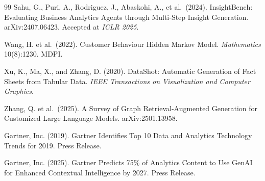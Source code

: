 \documentclass[12pt, a4paper]{article}
\begin{document}
\begin{thebibliography}{99}
Sahu, G., Puri, A., Rodriguez, J., Abaskohi, A., et al.\ (2024).
InsightBench: Evaluating Business Analytics Agents through Multi-Step Insight Generation.
arXiv:2407.06423. Accepted at \textit{ICLR 2025}.

Wang, H. et al.\ (2022).
Customer Behaviour Hidden Markov Model.
\textit{Mathematics} 10(8):1230. MDPI.

Xu, K., Ma, X., and Zhang, D. (2020).
DataShot: Automatic Generation of Fact Sheets from Tabular Data.
\textit{IEEE Transactions on Visualization and Computer Graphics}.

Zhang, Q. et al.\ (2025).
A Survey of Graph Retrieval-Augmented Generation for Customized Large Language Models.
arXiv:2501.13958.

Gartner, Inc. (2019).
Gartner Identifies Top 10 Data and Analytics Technology Trends for 2019.
Press Release.

Gartner, Inc. (2025).
Gartner Predicts 75\% of Analytics Content to Use GenAI for Enhanced Contextual Intelligence by 2027.
Press Release.

\end{thebibliography}
\end{document}
